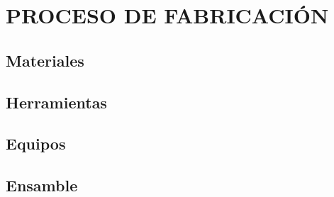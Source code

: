 \section{PROCESO DE FABRICACIÓN}

\subsection{Materiales}

\subsection{Herramientas}

\subsection{Equipos}

\subsection{Ensamble}